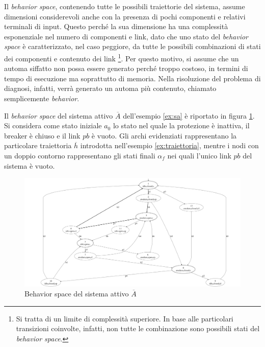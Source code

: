Il \emph{behavior space}, contenendo tutte le possibili traiettorie del sistema, assume dimensioni considerevoli anche con la presenza di pochi componenti e relativi terminali di input. Questo perché la sua dimensione ha una complessità esponenziale nel numero di componenti e link, dato che uno stato del \emph{behavior space} è caratterizzato, nel caso peggiore, da tutte le possibili combinazioni di stati dei componenti e contenuto dei link \footnote{Si tratta di un limite di complessità superiore. In base alle particolari transizioni coinvolte, infatti, non tutte le combinazione sono possibili stati del \emph{behavior space}.}. Per questo motivo, si assume che un automa siffatto non possa essere generato perché troppo costoso, in termini di tempo di esecuzione ma soprattutto di memoria. Nella risoluzione del problema di diagnosi, infatti, verrà generato un automa più contenuto, chiamato semplicemente \emph{behavior}.

\begin{ex}
Il \emph{behavior space} del sistema attivo $\overline{A}$ dell'esempio \ref{ex:sa} è riportato in figura \ref{fig:bsp}. Si considera come stato iniziale $a_0$ lo stato nel quale la protezione è inattiva, il breaker è chiuso e il link $pb$ è vuoto. Gli archi evidenziati rappresentano la particolare traiettoria $\overline{h}$ introdotta nell'esempio \ref{ex:traiettoria}, mentre i nodi con un doppio contorno rappresentano gli stati finali $\alpha_f$ nei quali l'unico link $pb$ del sistema è vuoto.
\end{ex}

\begin{figure}[htbp]
\centering
\includegraphics[scale=0.11]{./Img/sa/behavior_space.png}
\caption{Behavior space del sistema attivo $\overline{A}$}
\label{fig:bsp}
\end{figure}

\newpage
